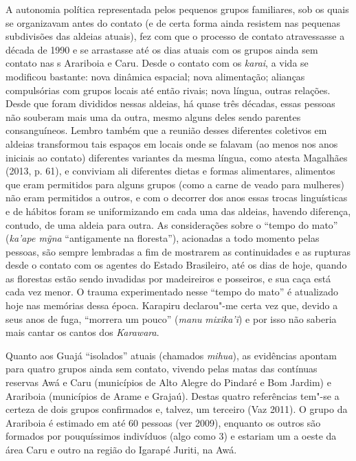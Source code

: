 A autonomia política representada pelos pequenos grupos familiares, sob
os quais se organizavam antes do contato (e de certa forma ainda
resistem nas pequenas subdivisões das aldeias atuais), fez com que o
processo de contato atravessasse a década de 1990 e se arrastasse até os
dias atuais com os grupos ainda sem contato nas s Arariboia e Caru.
Desde o contato com os \emph{karai}, a vida se modificou bastante: nova
dinâmica espacial; nova alimentação; alianças compulsórias com grupos
locais até então rivais; nova língua, outras relações. Desde que foram
divididos nessas aldeias, há quase três décadas, essas pessoas não
souberam mais uma da outra, mesmo alguns deles sendo parentes
consanguíneos. Lembro também que a reunião desses diferentes coletivos
em aldeias transformou tais espaços em locais onde se falavam (ao menos
nos anos iniciais ao contato) diferentes variantes da mesma língua, como
atesta Magalhães (2013, p. 61), e conviviam ali diferentes dietas e
formas alimentares, alimentos que eram permitidos para alguns grupos
(como a carne de veado para mulheres) não eram permitidos a outros, e
com o decorrer dos anos essas trocas linguísticas e de hábitos foram se
uniformizando em cada uma das aldeias, havendo diferença, contudo, de
uma aldeia para outra. As considerações sobre o ``tempo do mato''
(\emph{ka'ape mỹna} ``antigamente na floresta''), acionadas a todo
momento pelas pessoas, são sempre lembradas a fim de mostrarem as
continuidades e as rupturas desde o contato com os agentes do Estado
Brasileiro, até os dias de hoje, quando as florestas estão sendo
invadidas por madeireiros e posseiros, e sua caça está cada vez menor. O
trauma experimentado nesse ``tempo do mato'' é atualizado hoje nas
memórias dessa época. Karapiru declarou"-me certa vez que, devido a seus
anos de fuga, ``morrera um pouco'' (\emph{manu} \emph{mixika'ĩ}) e por
isso não saberia mais cantar os cantos dos \emph{Karawara}.

Quanto aos Guajá ``isolados'' atuais (chamados \emph{mihua}), as
evidências apontam para quatro grupos ainda sem contato, vivendo pelas
matas das contínuas reservas Awá e Caru (municípios de Alto Alegre do
Pindaré e Bom Jardim) e Arariboia (municípios de Arame e Grajaú). Destas
quatro referências tem"-se a certeza de dois grupos confirmados e,
talvez, um terceiro (Vaz 2011). O grupo da  Arariboia é estimado em
até 60 pessoas (ver  2009), enquanto os outros são formados por
pouquíssimos indivíduos (algo como 3) e estariam um a oeste da área Caru
e outro na região do Igarapé Juriti, na  Awá.

